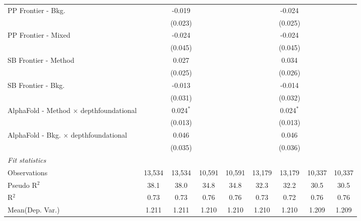 \begin{tabular}{lcccccccc}
   PP Frontier - Bkg.                             &               & -0.019         &        &        &               & -0.024         &        &   \\   
                                                  &               & (0.023)        &        &        &               & (0.025)        &        &   \\   
   PP Frontier - Mixed                            &               & -0.024         &        &        &               & -0.024         &        &   \\   
                                                  &               & (0.045)        &        &        &               & (0.045)        &        &   \\   
   SB Frontier - Method                           &               & 0.027          &        &        &               & 0.034          &        &   \\   
                                                  &               & (0.025)        &        &        &               & (0.026)        &        &   \\   
   SB Frontier - Bkg.                             &               & -0.013         &        &        &               & -0.014         &        &   \\   
                                                  &               & (0.031)        &        &        &               & (0.032)        &        &   \\   
   AlphaFold - Method $\times$ depthfoundational  &               & 0.024$^{*}$    &        &        &               & 0.024$^{*}$    &        &   \\   
                                                  &               & (0.013)        &        &        &               & (0.013)        &        &   \\   
   AlphaFold - Bkg. $\times$ depthfoundational    &               & 0.046          &        &        &               & 0.046          &        &   \\   
                                                  &               & (0.035)        &        &        &               & (0.036)        &        &   \\   
   \midrule
   \emph{Fit statistics}\\
   Observations                                   & 13,534        & 13,534         & 10,591 & 10,591 & 13,179        & 13,179         & 10,337 & 10,337\\  
   Pseudo R$^2$                                   & 38.1          & 38.0           & 34.8   & 34.8   & 32.3          & 32.2           & 30.5   & 30.5\\  
   R$^2$                                          & 0.73          & 0.73           & 0.76   & 0.76   & 0.73          & 0.72           & 0.76   & 0.76\\  
Mean(Dep. Var.) & 1.211 & 1.211 & 1.210 & 1.210 & 1.210 & 1.210 & 1.209 & 1.209 \\
   

\end{tabular}
